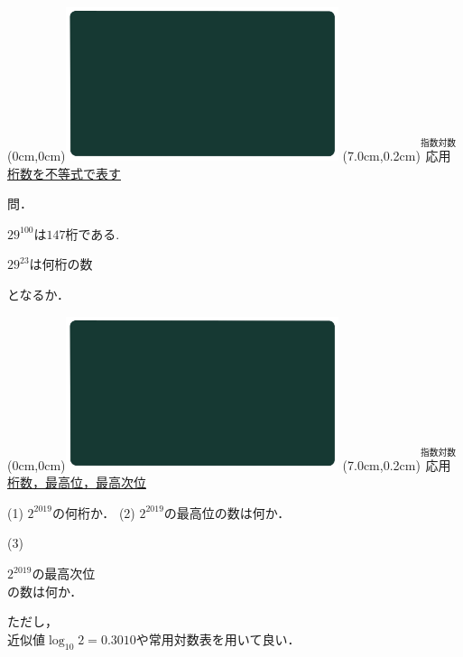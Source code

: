 \documentclass[10pt,
fleqn,
dvipdfmx,
uplatex
]{jsarticle}
\begin{document}
\newpage

\at(0cm,0cm){\includegraphics[width=8cm,bb=0 0 1920 1080]{./youtube/thumbnails/templates/smart_background/指数対数.jpeg}}
\at(7.0cm,0.2cm){\small\color{bradorange}$\overset{\text{指数対数}}{\text{応用}}$}
{\color{orange}\LARGE\underline{桁数を不等式で表す}}\vspace{0.3zw}

\normalsize
問．

\huge
\vspace{-0.8zw}
\hspace{0.3zw}
${29}^{100}$は${147}$桁である.

\HUGE
\vspace{-0.2zw}
\hspace{0.2zw}${29}^{23}$は何桁の数

\huge
\hfill となるか．

\newpage

\at(0cm,0cm){\includegraphics[width=8cm,bb=0 0 1920 1080]{./youtube/thumbnails/templates/smart_background/指数対数.jpeg}}
\at(7.0cm,0.2cm){\small\color{bradorange}$\overset{\text{指数対数}}{\text{応用}}$}
{\color{orange}\LARGE\underline{桁数，最高位，最高次位}}\vspace{0.3zw}

\small
(1)  $2^{{2019}}$の何桁か．
(2)  $2^{{2019}}$の最高位の数は何か．

(3)

\Huge
\vspace{-0.7zw}
\hspace{0.3zw}
$2^{{2019}}$の最高次位\vspace{-0.2zw}\\
\hfill の数は何か．

\small
\vspace{-1zw}
ただし，\\
\hfill 近似値$\log_{10} 2 = 0.3010$や常用対数表を用いて良い．
\end{document}
